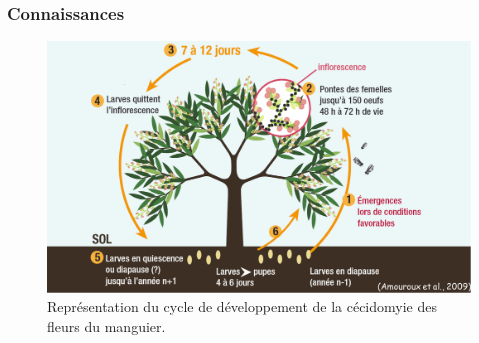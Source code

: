 \documentclass[xcolor={dvipsnames}]{beamer}
\begin{document}
\begin{frame}
 \frametitle{Connaissances}
 
 \begin{figure}
 \centering
 \includegraphics[scale = 0.2]{../photos/cycle.png}
 \caption{Représentation du cycle de développement de la cécidomyie des fleurs du manguier.}
 \label{fig:cycle}
\end{figure}
%
\end{frame}
\end{document}
